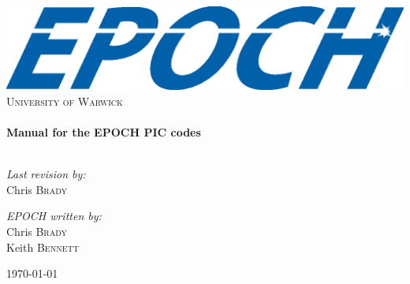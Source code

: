 \begin{titlepage}

\begin{center}

\includegraphics[width=14cm]{./images/EPOCHLogo.eps}\\[1cm]

\textsc{\LARGE University of Warwick}\\[1.5cm]

\HRule \\[0.4cm]
{ \huge \bfseries Manual for the EPOCH PIC codes}\\[0.4cm]

\HRule \\[1.5cm]

\begin{minipage}{0.4\textwidth}
\begin{flushleft} \large
\emph{Last revision by:}\\
Chris \textsc{Brady}
\end{flushleft}
\end{minipage}
\begin{minipage}{0.4\textwidth}
\begin{flushright} \large
\emph{EPOCH written by:} \\
Chris \textsc{Brady}\\
Keith \textsc{Bennett}\\
\end{flushright}
\end{minipage}

\vfill

{\large \today}

\end{center}

\end{titlepage}
